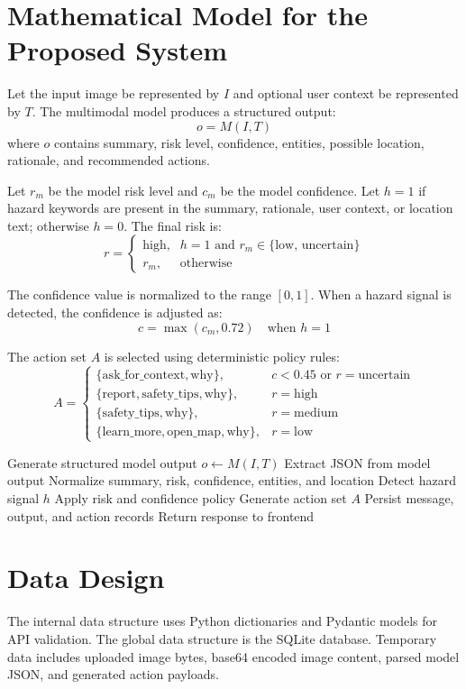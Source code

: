 \section{Mathematical Model for the Proposed System}
Let the input image be represented by $I$ and optional user context be represented by $T$. The multimodal model produces a structured output:
\[
o = M(I,T)
\]
where $o$ contains summary, risk level, confidence, entities, possible location, rationale, and recommended actions.

Let $r_m$ be the model risk level and $c_m$ be the model confidence. Let $h=1$ if hazard keywords are present in the summary, rationale, user context, or location text; otherwise $h=0$. The final risk is:
\[
r =
\begin{cases}
\text{high}, & h=1 \text{ and } r_m \in \{\text{low, uncertain}\} \\
r_m, & \text{otherwise}
\end{cases}
\]

The confidence value is normalized to the range $[0,1]$. When a hazard signal is detected, the confidence is adjusted as:
\[
c = \max(c_m, 0.72) \quad \text{when } h=1
\]

The action set $A$ is selected using deterministic policy rules:
\[
A =
\begin{cases}
\{\text{ask\_for\_context}, \text{why}\}, & c < 0.45 \text{ or } r=\text{uncertain} \\
\{\text{report}, \text{safety\_tips}, \text{why}\}, & r=\text{high} \\
\{\text{safety\_tips}, \text{why}\}, & r=\text{medium} \\
\{\text{learn\_more}, \text{open\_map}, \text{why}\}, & r=\text{low}
\end{cases}
\]

\begin{algorithm}[H]
\caption{Hazard-Aware Image Analysis Flow}
Generate structured model output $o \leftarrow M(I,T)$\;
Extract JSON from model output\;
Normalize summary, risk, confidence, entities, and location\;
Detect hazard signal $h$\;
Apply risk and confidence policy\;
Generate action set $A$\;
Persist message, output, and action records\;
Return response to frontend\;
\end{algorithm}

\section{Data Design}
The internal data structure uses Python dictionaries and Pydantic models for API validation. The global data structure is the SQLite database. Temporary data includes uploaded image bytes, base64 encoded image content, parsed model JSON, and generated action payloads.

